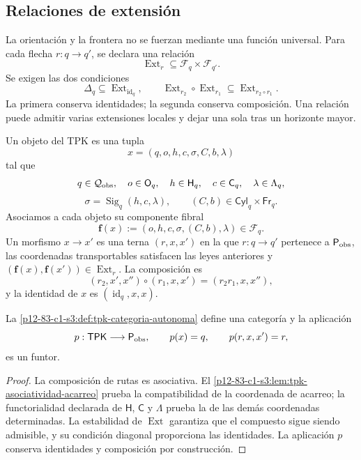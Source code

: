 {\subsection{Relaciones de extensión}

La orientación y la frontera no se fuerzan mediante una función universal.
Para cada flecha \(r:q\to q'\), se declara una relación
\[
 \operatorname{Ext}_r\subseteq\mathcal F_q\times\mathcal F_{q'}.
\]
Se exigen las dos condiciones
\[
 \Delta_q\subseteq\operatorname{Ext}_{\operatorname{id}_q},
 \qquad
 \operatorname{Ext}_{r_2}\circ\operatorname{Ext}_{r_1}
 \subseteq\operatorname{Ext}_{r_2\circ r_1}.
\]
La primera conserva identidades; la segunda conserva composición. Una
relación puede admitir varias extensiones locales y dejar una sola tras un
horizonte mayor.

\begin{definition}
\label{p12-83-c1-s3:def:tpk-categoria-autonoma}
Un objeto del TPK es una tupla
\[
 x=(q,o,h,c,\sigma,C,b,\lambda)
\]
tal que
\[
 q\in\mathcal Q_{\rm obs},\quad
 o\in\mathsf O_q,\quad
 h\in\mathsf H_q,\quad
 c\in\mathsf C_q,\quad
 \lambda\in\Lambda_q,
\]
\[
 \sigma=\operatorname{Sig}_q(h,c,\lambda),
 \qquad
 (C,b)\in\mathsf{Cyl}_q\times\mathsf{Fr}_q.
\]
Asociamos a cada objeto su componente fibral
\[
 \mathbf f(x):=(o,h,c,\sigma,(C,b),\lambda)\in\mathcal F_q.
\]
Un morfismo \(x\to x'\) es una terna \((r,x,x')\) en la que
\(r:q\to q'\) pertenece a \(\mathsf P_{\rm obs}\), las coordenadas
transportables satisfacen las leyes anteriores y
\((\mathbf f(x),\mathbf f(x'))\in
\operatorname{Ext}_r\). La composición es
\[
 (r_2,x',x'')\circ(r_1,x,x')=(r_2r_1,x,x''),
\]
y la identidad de \(x\) es \((\operatorname{id}_q,x,x)\).
\end{definition}

\begin{theorem}
\label{p12-83-c1-s3:thm:tpk-es-categoria}
La \cref{p12-83-c1-s3:def:tpk-categoria-autonoma} define una categoría y la aplicación
\[
 p:\mathsf{TPK}\longrightarrow\mathsf P_{\rm obs},
 \qquad p(x)=q,\qquad p(r,x,x')=r,
\]
es un funtor.
\end{theorem}

\begin{proof}
La composición de rutas es asociativa. El
\cref{p12-83-c1-s3:lem:tpk-asociatividad-acarreo} prueba la compatibilidad de la
coordenada de acarreo; la functorialidad declarada de \(\mathsf H\),
\(\mathsf C\) y \(\Lambda\) prueba la de las demás coordenadas
determinadas. La estabilidad de \(\operatorname{Ext}\) garantiza que el
compuesto sigue siendo admisible, y su condición diagonal proporciona las
identidades. La aplicación \(p\) conserva identidades y composición por
construcción.
\end{proof}

}
